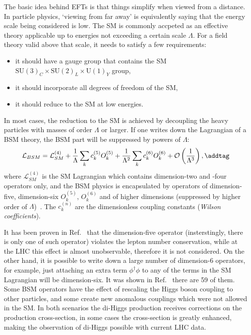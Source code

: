 The basic idea behind EFTs is that things simplify when viewed from a distance.
In particle physics, `viewing from far away' is equivalently saying that the energy
scale being considered is low. 
The SM is commonly accpeted as an effective theory applicable 
up to energies not exceeding a certain scale $\Lambda$. 
For a field theory valid above that scale, it needs to satisfy a few requirements:
\begin{itemize}
    \item it should have a gauge group that contains the SM $\text{SU}(3)_C \times \text{SU}(2)_L\times \text{U}(1)_Y$ group,
    \item it should incorporate all degrees of freedom of the SM,
    \item it should reduce to the SM at low energies.
\end{itemize}
In most cases, the reduction to the SM is achieved by 
decoupling the heavy particles with masses of order $\Lambda$ or larger. 
If one writes down the Lagrangian of a BSM theory, 
the BSM part will be suppressed by powers of $\Lambda$:
\[  
    \mathcal{L}_{BSM} = \mathcal{L}^{(4)}_{SM} + \frac{1}{\Lambda} \sum_k c^{(5)}_k O^{(5)}_k+
    \frac{1}{\Lambda^2} \sum_k c^{(6)}_k O^{(6)}_k + \mathcal{O} \left(\frac{1}{\Lambda^3}\right),
\addtag \]
where $\mathcal{L}^{(4)}_{SM}$ is the SM Lagrangian which contains dimension-two
and -four operators only, and the BSM physics is encapsulated by operators of 
dimension-five, dimension-six $O^{(5)}_k$, $O^{(6)}_k$ 
and of higher dimensions (suppressed by higher order of $\Lambda$)~\cite{EFT}.
The $c^{(n)}_k$ are the dimensionless coupling constants (\textit{Wilson coefficients}).

It has been proven in Ref.~\cite{EFT} that the dimension-five operator
(insterstingly, there is only one of such operator) violates 
the lepton number conservation, while at the LHC this effect is almost
unobservable, therefore it is not considered.
On the other hand, it is possible to write down a large number of dimension-6 operators, 
for example, just attaching an extra term $\phi^\dagger\phi$
to any of the terms in the SM Lagrangian will
be dimension-six. It was shown in Ref.~\cite{EFT-dimension-6} there are 59 of them.
Some BSM operators have the effect of rescaling the Higgs boson coupling to other 
particles, and some create new anomalous couplings which were not allowed in the SM. 
In both scenarios the di-Higgs production receives corrections on the production
cross-section, in some cases the cross-section is greatly enhanced, making 
the observation of di-Higgs possible with current LHC data.


